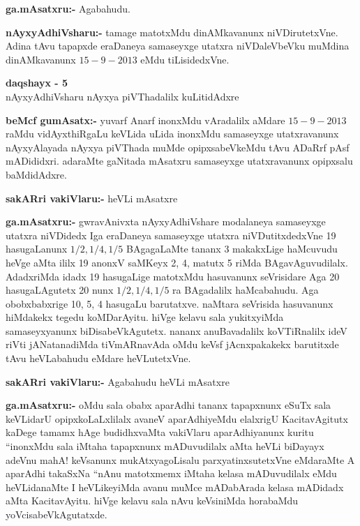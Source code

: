 \smallskip
\noindent
\textbf{ga.mAsatxru:-} Agabahudu.

\smallskip
\noindent
\textbf{nAyxyAdhiVsharu:-} tamage matotxMdu dinAMkavanunx niVDirutetxVne. Adina tAvu tapapxde eraDaneya samaseyxge utatxra niVDaleVbeVku muMdina dinAMkavanunx $15-9-2013$ eMdu tiLisidedxVne.

\begin{center}
{\bf  daqshayx - {\rm 5}}\\
nAyxyAdhiVsharu nAyxya piVThadalilx kuLitidAdxre
\end{center}

\smallskip
\noindent
\textbf{beMcf gumAsatx:-} yuvarf Anarf inonxMdu vAradalilx aMdare $15-9-2013$ raMdu vidAyxthiRgaLu keVLida uLida inonxMdu samaseyxge utatxravanunx nAyxyAlayada nAyxya piVThada muMde opipxsabeVkeMdu tAvu ADaRrf pAsf mADididxri. adaraMte gaNitada mAsatxru samaseyxge utatxravanunx opipxsalu baMdidAdxre.

\smallskip
\noindent
\textbf{sakARri vakiVlaru:-} heVLi mAsatxre

\smallskip
\noindent
\textbf{ga.mAsatxru:-} gwravAnivxta nAyxyAdhiVshare modalaneya samaseyxge utatxra niVDidedx Iga eraDaneya samaseyxge utatxra niVDutitxdedxVne {\rm 19} hasugaLanunx $1/2, 1/4, 1/5$ BAgagaLaMte tananx {\rm 3} makakxLige haMcuvudu heVge aMta ililx {\rm 19} anonxV saMKeyx {\rm 2, 4}, matutx {\rm 5} riMda BAgavAguvudilalx. AdadxriMda idadx {\rm 19} hasugaLige matotxMdu hasuvanunx seVrisidare Aga {\rm 20} hasugaLAgutetx {\rm 20} nunx $1/2, 1/4, 1/5$ ra BAgadalilx haMcabahudu. Aga obobxbabxrige {\rm 10, 5, 4} hasugaLu barutatxve. naMtara seVrisida hasuvanunx hiMdakekx tegedu koMDarAyitu. hiVge kelavu sala yukitxyiMda samaseyxyanunx biDisabeVkAgutetx. nananx anuBavadalilx koVTiRnalilx ideV riVti jANatanadiMda tiVmARnavAda oMdu keVsf jAcnxpakakekx barutitxde tAvu heVLabahudu eMdare heVLutetxVne.

\smallskip
\noindent
\textbf{sakARri vakiVlaru:-} Agabahudu heVLi mAsatxre 

\smallskip
\noindent
\textbf{ga.mAsatxru:-} oMdu sala obabx aparAdhi tananx tapapxnunx eSuTx sala keVLidarU opipxkoLaLxlilalx avaneV aparAdhiyeMdu elalxrigU KacitavAgitutx kaDege tamamx hAge budidhxvaMta vakiVlaru aparAdhiyanunx kuritu ``inonxMdu sala iMtaha tapapxnunx mADuvudilalx aMta heVLi biDayayx adeVnu mahA! keVsanunx mukAtxyagoLisalu parxyatinxsutetxVne eMdaraMte A aparAdhi takaSxNa ``nAnu matotxmemx iMtaha kelasa mADuvudilalx eMdu heVLidanaMte  I heVLikeyiMda avanu muMce mADabArada kelasa mADidadx aMta KacitavAyitu. hiVge kelavu sala nAvu keVsiniMda horabaMdu yoVcisabeVkAgutatxde.

